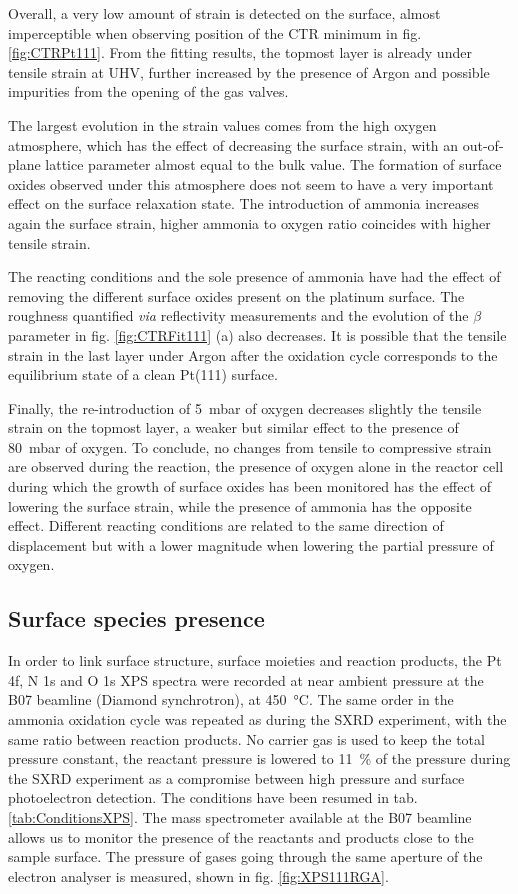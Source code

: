 Overall, a very low amount of strain is detected on the surface, almost imperceptible when observing position of the CTR minimum in fig. \ref{fig:CTRPt111}.
From the fitting results, the topmost layer is already under tensile strain at UHV, further increased by the presence of Argon and possible impurities from the opening of the gas valves.

The largest evolution in the strain values comes from the high oxygen atmosphere, which has the effect of decreasing the surface strain, with an out-of-plane lattice parameter almost equal to the bulk value.
The formation of surface oxides observed under this atmosphere does not seem to have a very important effect on the surface relaxation state.
The introduction of ammonia increases again the surface strain, higher ammonia to oxygen ratio coincides with higher tensile strain.

The reacting conditions and the sole presence of ammonia have had the effect of removing the different surface oxides present on the platinum surface.
The roughness quantified \textit{via} reflectivity measurements and the evolution of the $\beta$ parameter in fig. \ref{fig:CTRFit111} (a) also decreases.
It is possible that the tensile strain in the last layer under Argon after the oxidation cycle corresponds to the equilibrium state of a clean Pt(111) surface.

Finally, the re-introduction of \qty{5}{\milli\bar} of oxygen decreases slightly the tensile strain on the topmost layer, a weaker but similar effect to the presence of \qty{80}{\milli\bar} of oxygen.
To conclude, no changes from tensile to compressive strain are observed during the reaction, the presence of oxygen alone in the reactor cell during which the growth of surface oxides has been monitored has the effect of lowering the surface strain, while the presence of ammonia has the opposite effect.
Different reacting conditions are related to the same direction of displacement but with a lower magnitude when lowering the partial pressure of oxygen.

\subsection{Surface species presence}

In order to link surface structure, surface moieties and reaction products, the Pt 4f, N 1s and O 1s XPS spectra were recorded at near ambient pressure at the B07 beamline (Diamond synchrotron), at \qty{450}{\degreeCelsius}.
The same order in the ammonia oxidation cycle was repeated as during the SXRD experiment, with the same ratio between reaction products.
No carrier gas is used to keep the total pressure constant, the reactant pressure is lowered to \qty{11}{\percent} of the pressure during the SXRD experiment as a compromise between high pressure and surface photoelectron detection.
The conditions have been resumed in tab. \ref{tab:ConditionsXPS}.
The mass spectrometer available at the B07 beamline allows us to monitor the presence of the reactants and products close to the sample surface.
The pressure of gases going through the same aperture of the electron analyser is measured, shown in fig. \ref{fig:XPS111RGA}.

